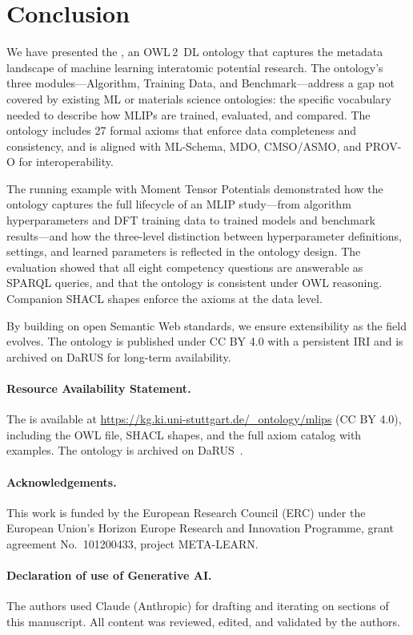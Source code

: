 \section{Conclusion}
\label{sec:conclusion}

We have presented the \MLIPsOntology{}, an OWL\,2~DL ontology that captures
the metadata landscape of machine learning interatomic potential research.
The ontology's three modules---Algorithm, Training Data, and
Benchmark---address a gap not covered by existing ML or materials science
ontologies: the specific vocabulary needed to describe how MLIPs are trained,
evaluated, and compared. The ontology includes 27 formal axioms that enforce
data completeness and consistency, and is aligned with ML-Schema, MDO,
CMSO/ASMO, and PROV-O for interoperability.

The running example with Moment Tensor Potentials demonstrated how the
ontology captures the full lifecycle of an MLIP study---from algorithm
hyperparameters and DFT training data to trained models and benchmark
results---and how the three-level distinction between hyperparameter
definitions, settings, and learned parameters is reflected in the ontology
design. The evaluation showed that all eight competency questions are
answerable as SPARQL queries, and that the ontology is consistent under
OWL reasoning. Companion SHACL shapes enforce the axioms at the data level.

By building on open Semantic Web standards, we ensure extensibility as the
field evolves. The ontology is published under CC BY 4.0 with a persistent
IRI and is archived on DaRUS for long-term availability.

%
\paragraph{Resource Availability Statement.}
The \MLIPsOntology{} is available at
\url{https://kg.ki.uni-stuttgart.de/_ontology/mlips} (CC BY 4.0), including
the OWL file, SHACL shapes, and the full axiom catalog with examples.
The ontology is archived on DaRUS~\cite{darus2024}.
%
\paragraph{Acknowledgements.}
This work is funded by the European Research Council (ERC) under the European
Union's Horizon Europe Research and Innovation Programme, grant agreement
No.\ 101200433, project META-LEARN.
%
\paragraph{Declaration of use of Generative AI.}
The authors used Claude (Anthropic) for drafting and iterating on sections of
this manuscript. All content was reviewed, edited, and validated by the
authors.
